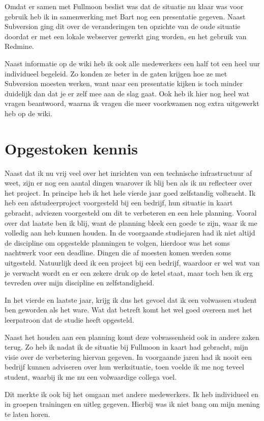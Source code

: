 Omdat er samen met Fullmoon beslist was dat de situatie nu klaar was voor gebruik heb ik in samenwerking met Bart nog een presentatie gegeven. Naast Subversion ging dit over de veranderingen ten opzichte van de oude situatie doordat er met een lokale webserver gewerkt ging worden, en het gebruik van Redmine.

Naast informatie op de wiki heb ik ook alle medewerkers een half tot een heel uur individueel begeleid. Zo konden ze beter in de gaten krijgen hoe ze met Subversion moesten werken, want naar een presentatie kijken is toch minder duidelijk dan dat je er zelf mee aan de slag gaat. Ook heb ik hier nog heel wat vragen beantwoord, waarna ik vragen die meer voorkwamen nog extra uitgewerkt heb op de wiki.

\section{Opgestoken kennis}

Naast dat ik nu vrij veel over het inrichten van een technische infrastructuur af weet, zijn er nog een aantal dingen waarover ik blij ben als ik nu reflecteer over het project. In principe heb ik het hele vierde jaar goed zelfstandig volbracht. Ik heb een afstudeerproject voorgesteld bij een bedrijf, hun situatie in kaart gebracht, adviezen voorgesteld om dit te verbeteren en een hele planning. Vooral over dat laatste ben ik blij, want de planning bleek een goede te zijn, waar ik me volledig aan heb kunnen houden. In de voorgaande studiejaren had ik niet altijd de discipline om opgestelde planningen te volgen, hierdoor was het soms nachtwerk voor een deadline. Dingen die af moesten komen werden soms uitgesteld. Natuurlijk deed ik een project bij een bedrijf, waardoor er wel wat van je verwacht wordt en er een zekere druk op de ketel staat, maar toch ben ik erg tevreden over mijn discipline en zelfstandigheid.

In het vierde en laatste jaar, krijg ik dus het gevoel dat ik een volwassen student ben geworden als het ware. Wat dat betreft komt het wel goed overeen met het leerpatroon dat de studie heeft opgesteld.

Naast het houden aan een planning komt deze volwassenheid ook in andere zaken terug. Zo heb ik nadat ik de situatie bij Fullmoon in kaart had gebracht, mijn visie over de verbetering hiervan gegeven. In voorgaande jaren had ik nooit een bedrijf kunnen adviseren over hun werksituatie, toen voelde ik me nog teveel student, waarbij ik me nu een volwaardige collega voel. 

Dit merkte ik ook bij het omgaan met andere medewerkers. Ik heb individueel en in groepen trainingen en uitleg gegeven. Hierbij was ik niet bang om mijn mening te laten horen.